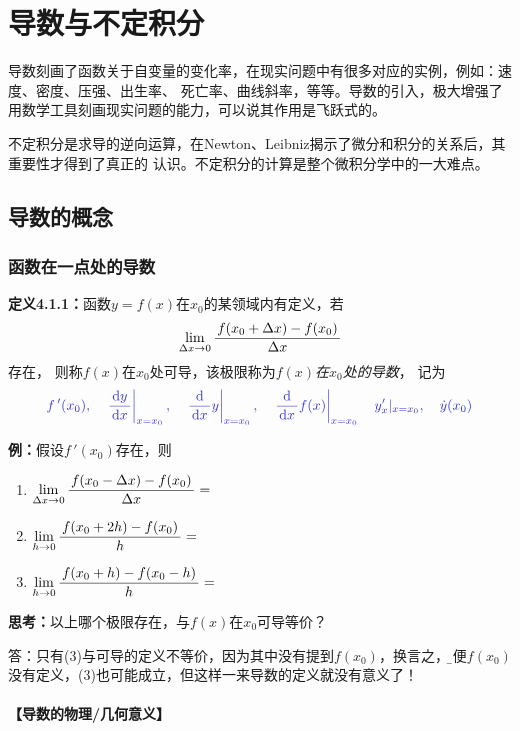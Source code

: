 \setcounter{chapter}{3}

\chapter{导数与不定积分}

导数刻画了函数关于自变量的变化率，在现实问题中有很多对应的实例，例如：速度、密度、压强、出生率、
死亡率、曲线斜率，等等。导数的引入，极大增强了用数学工具刻画现实问题的能力，可以说其作用是飞跃式的。

不定积分是求导的逆向运算，在Newton、Leibniz揭示了微分和积分的关系后，其重要性才得到了真正的
认识。不定积分的计算是整个微积分学中的一大难点。

\section{导数的概念}

\subsection{函数在一点处的导数}

{\bf 定义4.1.1：}函数$y=f(x)$在$x_0$的某领域内有定义，若
$$\lim\limits_{\Delta x\to 0}\displaystyle\frac{\,{f(x_0+\Delta x)-f(x_0)}\,}{\,{\Delta x}\,}$$
存在， 则称{$f(x)$在$x_0$处可导}，该极限称为{\it $f(x)$在$x_0$处的导数}， 记为
$${\b f\,'(x_0),\quad \left.\df{\d y}{\d x}\right|_{x=x_0},\quad\left.\df{\d
}{\d x}y\right|_{x=x_0},\quad \left.\df{\d }{\d x}f(x)\right|_{x=x_0}\quad
y'_x|_{x=x_0},\quad \dot{y}(x_0)}$$

{\bf 例：}假设$f\,'(x_0)$存在，则
\begin{enumerate}[(1)]
  \setlength{\itemindent}{1cm}
  \item $\lim\limits_{\Delta x\to 0}\displaystyle\frac{\,{f(x_0-\Delta x)-f(x_0)}\,}{\,{\Delta
  x}\,}=$ \underline{\quad} 
  \item $\lim\limits_{h\to 0}\displaystyle\frac{\,{f(x_0+2h)-f(x_0)}\,}{\,{h}\,}=$
   \underline{\quad} 
  \item $\lim\limits_{h\to 0}\displaystyle\frac{\,{f(x_0+h)-f(x_0-h)}\,}{\,{h}\,}=$ 
  \underline{\quad}
\end{enumerate}

{\bf 思考：}以上哪个极限存在，与$f(x)$在$x_0$可导等价？

答：只有(3)与可导的定义不等价，因为其中没有提到$f(x_0)$，换言之，{\b 即便$f(x_0)$
没有定义，(3)也可能成立，但这样一来导数的定义就没有意义了！}

\subsubsection{【导数的物理/几何意义】}

